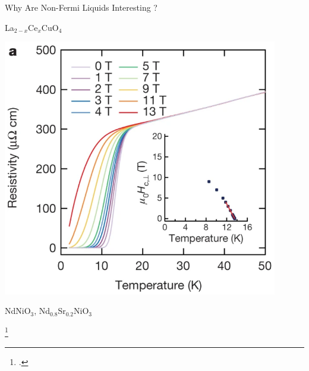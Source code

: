 \documentclass[aspectratio=169]{beamer}
\begin{document}
\begin{frame}{Why Are Non-Fermi Liquids Interesting ?}
\begin{minipage}{0.32\textwidth}
La$_{2−x}$Ce$_x$CuO$_4$
\end{minipage}
\begin{minipage}{0.32\textwidth}
	\includegraphics[width=0.9\textwidth]{nickelateStrange.png}

NdNiO$_3$, Nd$_{0.8}$Sr$_{0.2}$NiO$_3$
\end{minipage}

\footcite{Custers2003,Legros2019,SarkarStrangeMetal2020}
\end{frame}
\end{document}
